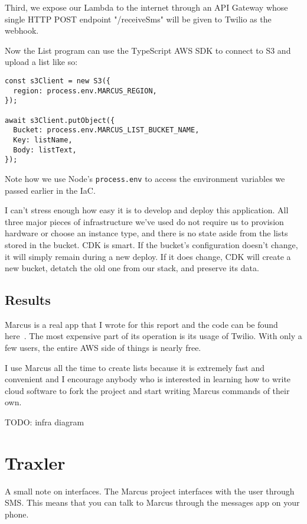 \documentclass{article}
\begin{document}
Third, we expose our Lambda to the internet through an API Gateway whose single HTTP POST endpoint "/receiveSms" will be given to Twilio as the webhook.

Now the List program can use the TypeScript AWS SDK to connect to S3 and upload a list like so:

\begin{verbatim}
const s3Client = new S3({
  region: process.env.MARCUS_REGION,
});

await s3Client.putObject({
  Bucket: process.env.MARCUS_LIST_BUCKET_NAME,
  Key: listName,
  Body: listText,
});
\end{verbatim}

Note how we use Node's \texttt{process.env} to access the environment variables we passed earlier in the IaC.

I can't stress enough how easy it is to develop and deploy this application.
All three major pieces of infrastructure we've used do not require us to provision hardware or choose an instance type, and there is no state aside from the lists stored in the bucket.
CDK is smart.
If the bucket's configuration doesn't change, it will simply remain during a new deploy.
If it does change, CDK will create a new bucket, detatch the old one from our stack, and preserve its data.

\subsection{Results}

Marcus is a real app that I wrote for this report and the code can be found here~\cite{marcus}.
The most expensive part of its operation is its usage of Twilio.
With only a few users, the entire AWS side of things is nearly free.

I use Marcus all the time to create lists because it is extremely fast and convenient and I encourage anybody who is interested in learning how to write cloud software to fork the project and start writing Marcus commands of their own.

TODO: infra diagram

\section{Traxler}

A small note on interfaces.
The Marcus project interfaces with the user through SMS.
This means that you can talk to Marcus through the messages app on your phone.
\end{document}

